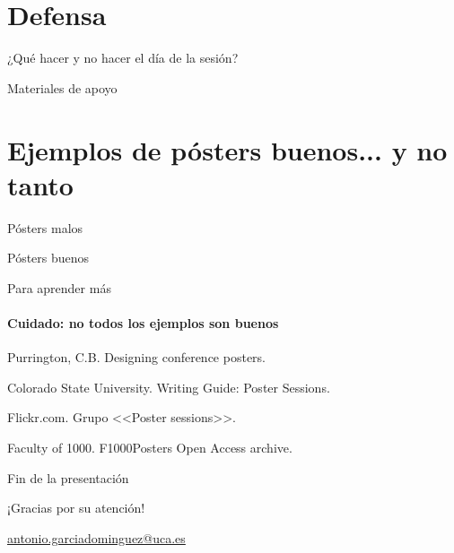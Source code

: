 \documentclass[xcolor=svgnames,compress]{beamer}
\begin{document}
\section{Defensa}

\begin{frame}{¿Qué hacer y no hacer el día de la sesión?}

\end{frame}

\begin{frame}{Materiales de apoyo}


\end{frame}

\section[Ejemplos]{Ejemplos de pósters buenos... y no tanto}
\label{sec:posters}

\begin{frame}{Pósters malos}
  
\end{frame}

\begin{frame}{Pósters buenos}
  
\end{frame}

\appendix

\begin{frame}{Para aprender más}
  \framesubtitle{Cuidado: no todos los ejemplos son buenos}

  \begin{thebibliography}{10}
    \beamertemplatearticlebibitems
     Purrington, C.B.
      \newblock Designing conference posters.

     Colorado State University.
      \newblock Writing Guide: Poster Sessions.

     Flickr.com.
      \newblock Grupo <<Poster sessions>>.

     Faculty of 1000.
      \newblock F1000Posters Open Access archive.
  \end{thebibliography}
\end{frame}

\begin{frame}{Fin de la presentación}
  \begin{center}
    {\Huge ¡Gracias por su atención!}

    \vspace{3em}

    {\Large
      \href{mailto:antonio.garciadominguez@uca.es}{antonio.garciadominguez@uca.es}}
  \end{center}
\end{frame}
\end{document}
